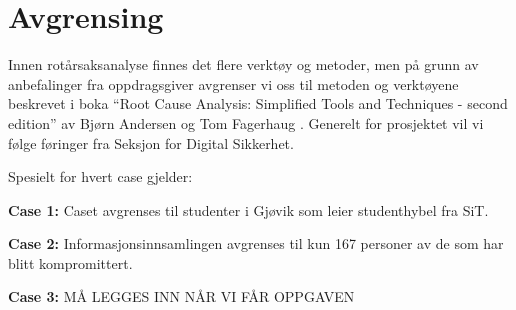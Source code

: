\section{Avgrensing}
\label{sec:avgrensing}
Innen rotårsaksanalyse finnes det flere verktøy og metoder, men på grunn av anbefalinger fra oppdragsgiver avgrenser vi oss til metoden og verktøyene beskrevet i boka ``Root Cause Analysis: Simplified Tools and Techniques - second edition'' av Bjørn Andersen og Tom Fagerhaug \cite{RCA}. Generelt for prosjektet vil vi følge føringer fra Seksjon for Digital Sikkerhet.

\noindent Spesielt for hvert case gjelder:

\textbf{Case 1:}
Caset avgrenses til studenter i Gjøvik som leier studenthybel fra SiT.

\textbf{Case 2:}
Informasjonsinnsamlingen avgrenses til kun 167 personer av de som har blitt kompromittert. 

\textbf{Case 3:}
MÅ LEGGES INN NÅR VI FÅR OPPGAVEN

